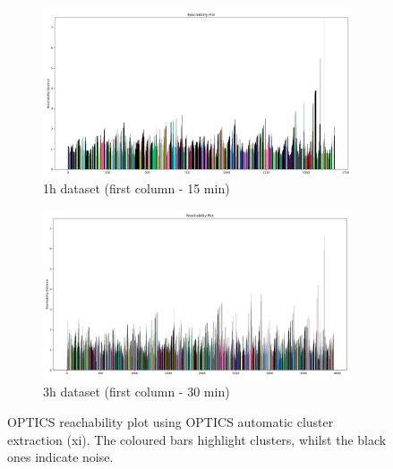   \begin{figure}[H]
    \centering
    \begin{subfigure}{.5\textwidth}\captionsetup{width=.8\linewidth}
      \centering
      \includegraphics[width=1\textwidth]{./images/OPTICS/1h-1-reachabilityPlot-xi.png}
    \caption{1h dataset (first column - 15 min)}
    \end{subfigure}%
    \begin{subfigure}{.5\textwidth}\captionsetup{width=.8\linewidth}
      \centering
      \includegraphics[width=1\textwidth]{./images/OPTICS/3h-1-reachabilityPlot-xi.png}
      \caption{3h dataset (first column - 30 min)}
    \end{subfigure}
    \caption{OPTICS reachability plot using OPTICS automatic cluster extraction (xi). The coloured bars highlight clusters, whilst the black ones indicate noise.}
    \label{figure:OPTICSXiResultsReachabilityPlot}
    \end{figure}


